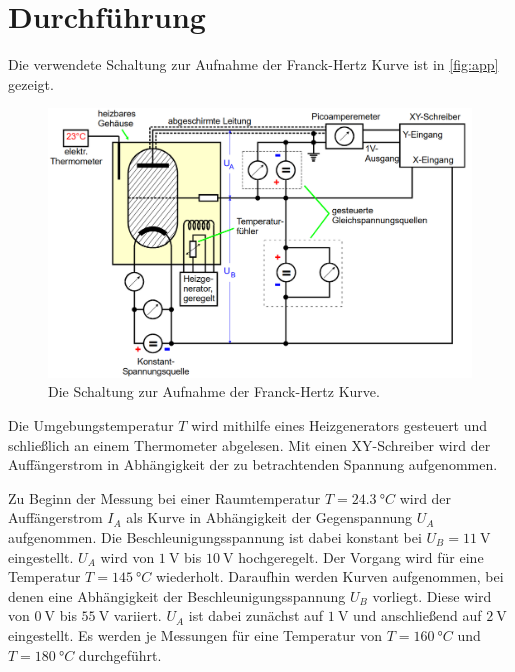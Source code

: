 \section{Durchführung}
\label{sec:durchführung}
Die verwendete Schaltung zur Aufnahme der Franck-Hertz Kurve ist in \autoref{fig:app} gezeigt.
\begin{figure}[H]
	\centering
	\includegraphics[width=0.75\linewidth]{content/grafik/apperatur.png}
	\caption{Die Schaltung zur Aufnahme der Franck-Hertz Kurve. \cite{franck}}
	\label{fig:app}
\end{figure}
Die Umgebungstemperatur $T$ wird mithilfe eines Heizgenerators gesteuert und schließlich an einem 
Thermometer abgelesen. Mit einen XY-Schreiber wird der Auffängerstrom in Abhängigkeit der zu betrachtenden Spannung aufgenommen.

Zu Beginn der Messung bei einer Raumtemperatur $T =\qty{24.3}{°C}$ wird der Auffängerstrom $I_A$ als Kurve in Abhängigkeit der Gegenspannung $U_A$ aufgenommen.
Die Beschleunigungsspannung ist dabei konstant bei $ U_B = \SI{11}{\volt}$ eingestellt. $U_A$ wird von $\SI{1}{\volt}$ bis $\SI{10}{\volt}$ hochgeregelt.
Der Vorgang wird für eine Temperatur $T =\qty{145}{°C}$ wiederholt. Daraufhin werden Kurven aufgenommen, bei denen eine Abhängigkeit der
Beschleunigungsspannung $U_B$ vorliegt. Diese wird von $\SI{0}{\volt}$ bis $\SI{55}{\volt}$ variiert. $U_A$ ist dabei zunächst auf $\SI{1}{\volt}$ und
anschließend auf $\SI{2}{\volt}$ eingestellt. Es werden je Messungen für eine Temperatur von $T = \qty{160}{°C}$ und $T = \qty{180}{°C}$ durchgeführt.

